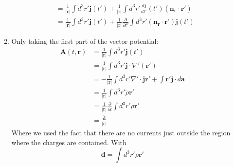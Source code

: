 \documentclass[12pt,a4]{article}
\begin{document}
\begin{enumerate}
\begin{enumerate}
\begin{align*}
                                   &=       \frac{1}{|\mathbf{r}|} \int d^3r' \mathbf{j}(t')  + \frac{1}{|\mathbf{r}|} \int d^3r'\frac{d \mathbf{j}}{dt'}(t') (\mathbf{n}_\mathbf{r} \cdot \mathbf{r}')\\
                                   &=       \frac{1}{|\mathbf{r}|} \int d^3r' \mathbf{j}(t')  + \frac{1}{|\mathbf{r}|} \frac{\partial }{\partial t'}\int d^3r'(\mathbf{n}_\mathbf{r} \cdot \mathbf{r}') \mathbf{j}(t') 
        \end{align*}
      \item
        Only taking the first part of the vector potential:
        \begin{align*}
          \mathbf{A}(t,\mathbf{r}) &= \frac{1}{|\mathbf{r}|} \int d^3r' \mathbf{j}(t') \\
                                   &= \frac{1}{|\mathbf{r}|} \int d^3r' \mathbf{j} \cdot \nabla'(\mathbf{r}') \\
                                   &= -\frac{1}{|\mathbf{r}|} \int d^3r' \nabla' \cdot \mathbf{j} \mathbf{r}' + \int \mathbf{r'} \mathbf{j} \cdot d \mathbf{a}\\
                                   &= \frac{1}{|\mathbf{r}|} \int d^3r' \dot \rho \mathbf{r}'  \\
                                   &= \frac{1}{|\mathbf{r}|} \frac{\partial}{\partial t}\int d^3r' \rho \mathbf{r}'  \\
                                   &= \frac{\dot{\mathbf{d}}}{|\mathbf{r}|}
        \end{align*}
        Where we used the fact that there are no currents just outside the region where the charges are contained.
        With
        \begin{equation*}
          \dot{\mathbf{d}} = \int d^3r' \rho \mathbf{r}'
        \end{equation*}


\end{enumerate}
\end{enumerate}
\end{document}
